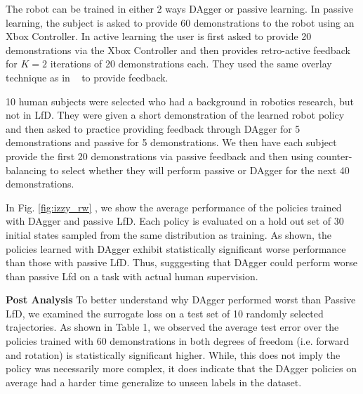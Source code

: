 \documentclass[10pt, conference]{ieeeconf}      %
\begin{document}
The robot can be trained in either 2 ways DAgger or passive learning. In passive learning, the subject is asked to provide 60 demonstrations to the robot using an Xbox Controller. In active learning the user is first asked to provide 20 demonstrations via the Xbox Controller and then provides retro-active feedback for $K=2$ iterations of 20 demonstrations each. They used the same overlay technique as in ~\cite{laskeyrobot} to provide feedback. 

10 human subjects were selected who had a background in robotics research, but not in LfD. They were given a short demonstration of the learned robot policy and then asked to practice providing feedback through DAgger for 5 demonstrations and passive for 5 demonstrations. We then have each subject provide the first 20 demonstrations via passive feedback and then using counter-balancing to select whether they will perform passive or DAgger for the next 40 demonstrations.  

In Fig. \ref{fig:izzy_rw} , we show the average performance of the policies trained with DAgger and passive LfD. Each policy is evaluated on a hold out set of 30 initial states sampled from the same distribution as training. As shown, the policies learned with DAgger exhibit statistically significant worse performance than those with passive LfD. Thus, sugggesting that DAgger could perform worse than passive Lfd on a task with actual human supervision. 

\noindent \textbf{Post Analysis}
To better understand why DAgger performed worst than Passive LfD, we examined the surrogate loss on a test set of 10 randomly selected trajectories.  As shown in Table 1, we observed the average test error over the policies trained with 60 demonstrations in both degrees of freedom (i.e. forward and rotation) is statistically significant higher. While, this does not imply the policy was necessarily more complex, it does indicate that the DAgger policies on average had a harder time generalize to unseen labels in the dataset. 
\end{document}
